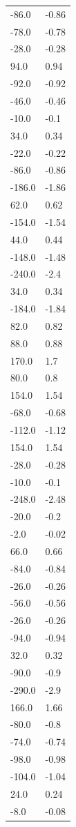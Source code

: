 \begin{longtable}{ll}
-86.0 & -0.86 \\
-78.0 & -0.78 \\
-28.0 & -0.28 \\
94.0 & 0.94 \\
-92.0 & -0.92 \\
-46.0 & -0.46 \\
-10.0 & -0.1 \\
34.0 & 0.34 \\
-22.0 & -0.22 \\
-86.0 & -0.86 \\
-186.0 & -1.86 \\
62.0 & 0.62 \\
-154.0 & -1.54 \\
44.0 & 0.44 \\
-148.0 & -1.48 \\
-240.0 & -2.4 \\
34.0 & 0.34 \\
-184.0 & -1.84 \\
82.0 & 0.82 \\
88.0 & 0.88 \\
170.0 & 1.7 \\
80.0 & 0.8 \\
154.0 & 1.54 \\
-68.0 & -0.68 \\
-112.0 & -1.12 \\
154.0 & 1.54 \\
-28.0 & -0.28 \\
-10.0 & -0.1 \\
-248.0 & -2.48 \\
-20.0 & -0.2 \\
-2.0 & -0.02 \\
66.0 & 0.66 \\
-84.0 & -0.84 \\
-26.0 & -0.26 \\
-56.0 & -0.56 \\
-26.0 & -0.26 \\
-94.0 & -0.94 \\
32.0 & 0.32 \\
-90.0 & -0.9 \\
-290.0 & -2.9 \\
166.0 & 1.66 \\
-80.0 & -0.8 \\
-74.0 & -0.74 \\
-98.0 & -0.98 \\
-104.0 & -1.04 \\
24.0 & 0.24 \\
-8.0 & -0.08 \\

\end{longtable}
